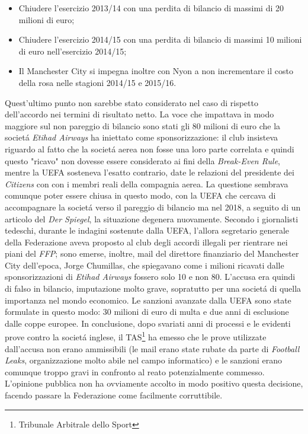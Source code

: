 \documentclass[
    corpo=12pt,
    oneside,
    evenboxes,
    tipotesi=triennale,
    stile=classica,
    oldstyle,
    autoretitolo,
    greek,
]{toptesi}
\begin{document}
\begin{interlinea}{1.5}
\begin{itemize}
    \item Chiudere l’esercizio 2013/14 con una perdita di bilancio di massimi di 20 milioni di euro;
    \item Chiudere l’esercizio 2014/15 con una perdita di bilancio di massimi 10 milioni di euro nell’esercizio 2014/15;
    \item Il Manchester City si impegna inoltre con Nyon a non incrementare il costo della rosa nelle stagioni 2014/15 e 2015/16.
\end{itemize}
Quest'ultimo punto non sarebbe stato considerato nel caso di rispetto dell'accordo nei termini di risultato netto. \newline
La voce che impattava in modo maggiore sul non pareggio di bilancio sono stati gli 80 milioni di euro che la societ\'a \emph{Etihad Airways}
ha iniettato come sponsorizzazione: il club insisteva riguardo al fatto che la societ\'a aerea non fosse una loro parte correlata e quindi questo
"ricavo" non dovesse essere considerato ai fini della \emph{Break-Even Rule}, mentre la UEFA sosteneva l'esatto contrario, date le 
relazioni del presidente dei \emph{Citizens} con con i membri reali della compagnia aerea. 
La questione sembrava comunque poter essere chiusa in questo modo, con la UEFA che cercava di accompagnare la societ\'a verso il 
pareggio di bilancio ma nel 2018, a seguito di un articolo del \emph{Der Spiegel}, la situazione degenera nuovamente.
Secondo i giornalisti tedeschi, durante le indagini sostenute dalla UEFA, l'allora segretario generale della Federazione aveva proposto al club degli accordi illegali per
rientrare nei piani del \emph{FFP}; sono emerse, inoltre, mail del direttore finanziario del Manchester
City dell'epoca, Jorge Chumillas, che spiegavano come i milioni ricavati dalle sponsorizzazioni di \emph{Etihad Airways} fossero solo 10 e non 80.
L'accusa era quindi di falso in bilancio, imputazione molto grave, sopratutto per una societ\'a di quella importanza nel mondo economico. Le 
sanzioni avanzate dalla UEFA sono state formulate in questo modo: 30 milioni di euro di multa e due anni di esclusione dalle coppe europee.
In conclusione, dopo svariati anni di processi e le evidenti prove contro la societ\'a inglese, il TAS\footnote{Tribunale Arbitrale dello Sport} ha 
emesso che le prove utilizzate dall'accusa non erano ammissibili (le mail erano state rubate da parte di \emph{Football Leaks}, organizzazione molto
abile nel campo informatico) e le sanzioni erano comunque troppo gravi in confronto al reato potenzialmente commesso. L'opinione pubblica
non ha ovviamente accolto in modo positivo questa decisione, facendo passare la Federazione come facilmente corruttibile.\newline

\end{interlinea}
\end{document}
